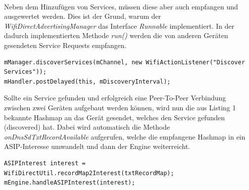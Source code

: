 \\Neben dem Hinzufügen von Services, müssen diese aber auch empfangen und ausgewertet werden. Dies ist der Grund, warum der \textit{WifiDirectAdvertisingManager} das Interface \textit{Runnable} implementiert. In der dadurch implementierten Methode \textit{run()} werden die von anderen Geräten gesendeten Service Requests empfangen.\newline
\lstset{language=Java, caption=Erkennung von Services, label=DescriptiveLabel, numbers=left, numbersep=1em, breaklines=true, basicstyle=\small}
\begin{lstlisting}
mManager.discoverServices(mChannel, new WifiActionListener("Discover Services"));
mHandler.postDelayed(this, mDiscoveryInterval);
\end{lstlisting}
Sollte ein Service gefunden und erfolgreich eine Peer-To-Peer Verbindung zwischen zwei Geräten aufgebaut werden können, wird nun die aus Listing 1 bekannte Hashmap an das Gerät gesendet, welches den Service gefunden (discovered) hat. Dabei wird automatisch die Methode \textit{onDnsSdTxtRecordAvailable} aufgerufen, welche die empfangene Hashmap in ein ASIP-Interesse umwandelt und dann der Engine weiterreicht.\newline
\lstset{language=Java, caption=Vewertung des Interesses, label=DescriptiveLabel, numbers=left, numbersep=1em, breaklines=true, basicstyle=\small}
\begin{lstlisting}
ASIPInterest interest = WifiDirectUtil.recordMap2Interest(txtRecordMap);
mEngine.handleASIPInterest(interest);
\end{lstlisting}  

